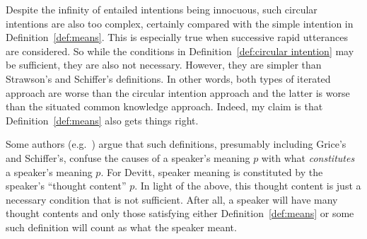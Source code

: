 Despite the infinity of entailed intentions being innocuous, such circular intentions are also too complex, certainly compared with the simple intention in Definition~\ref{def:means}. This is especially true when successive rapid utterances are considered. So while the conditions in Definition~\ref{def:circular intention} may be sufficient, they are also not necessary. However, they are simpler than Strawson's and Schiffer's definitions. In other words, both types of iterated approach are worse than the circular intention approach and the latter is worse than the situated common knowledge approach. Indeed, my claim is that Definition~\ref{def:means} also gets things right.

Some authors (e.g.\ \citealt{devitt:mflp})  argue that such definitions, presumably including Grice's and Schiffer's, confuse the causes of a speaker's meaning $p$ with what \emph{constitutes} a speaker's meaning $p$. For Devitt, speaker meaning is constituted by the speaker's ``thought content'' $p$. In light of the above, this thought content is just a necessary condition that is not sufficient. After all, a speaker will have many thought contents and only those satisfying either Definition~\ref{def:means} or some such definition will count as what the speaker meant. 




